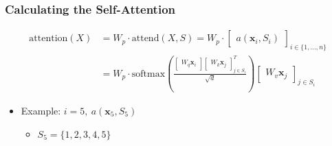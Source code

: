 \documentclass[dvipdfmx]{beamer}
\begin{document}
\begin{frame}
    \frametitle{Calculating the Self-Attention}
    {\small
        \begin{align*}
            \mathrm{attention}(X) &= W_p \cdot \mathrm{attend}(X, S)
                = W_p \cdot \begin{bmatrix} a(\bm{x}_i, S_i) \end{bmatrix}_{i \in \{ 1, \ldots, n \}} \\
                &= W_p \cdot \mathrm{softmax}
                    \left(
                        \frac{
                            \begin{bmatrix} W_q \bm{x}_i \end{bmatrix}
                            \begin{bmatrix} W_k \bm{x}_j \end{bmatrix}^T_{j \in S_i}
                        }{\sqrt{d}}
                    \right)
                    \begin{bmatrix} W_v \bm{x}_j \end{bmatrix}_{j \in S_i}
        \end{align*}
    }
    \begin{itemize}
        \item Example: $i = 5, \ a(\bm{x}_5, S_5)$
        \begin{itemize}
            \item $S_5 = \{ 1, 2, 3, 4, 5 \}$
        \end{itemize}
    \end{itemize}
\end{frame}
\end{document}
